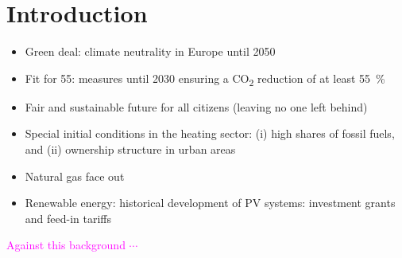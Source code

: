 \section{Introduction}
\begin{itemize}
	\item Green deal: climate neutrality in Europe until 2050
	\item Fit for 55: measures until 2030 ensuring a CO\textsubscript{2} reduction of at least \SI{55}{\%} 
	\item Fair and sustainable future for all citizens (leaving no one left behind)
	\item Special initial conditions in the heating sector: (i) high shares of fossil fuels, and (ii) ownership structure in urban areas
	\item Natural gas face out
\end{itemize}

\vspace{0.5cm}

\begin{itemize}
	\item Renewable energy: historical development of PV systems: investment grants and feed-in tariffs
\end{itemize}

\textcolor{magenta}{Against this background $\cdots$}




